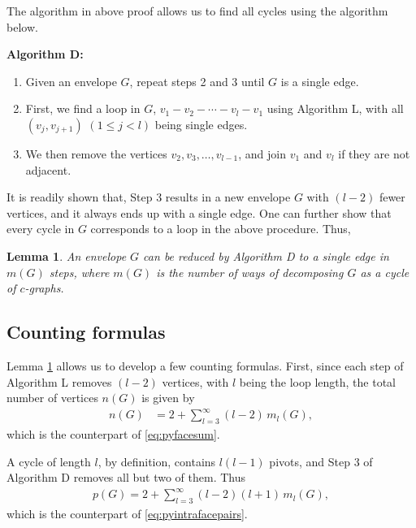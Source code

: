 \documentclass[aip,jcp,reprint,superscriptaddress]{revtex4-1}
\newtheorem{lemm}[thrm]{Lemma}
\begin{document}
The algorithm in above proof allows us to
  find all cycles using the algorithm below.

\textbf{Algorithm D:}
\begin{enumerate}
  \item
    Given an envelope $G$,
      repeat steps 2 and 3 until $G$ is a single edge.
  \item
    First, we find a loop in $G$,
      $v_1 - v_2 - \cdots - v_l - v_1$
      using Algorithm L,
      with all $(v_j, v_{j+1})$ $(1 \le j < l)$
      being single edges.
  \item
    We then remove the vertices $v_2, v_3, \dots, v_{l-1}$,
      and join $v_1$ and $v_l$ if they are not adjacent.
\end{enumerate}
%
It is readily shown that,
  Step 3 results in a new envelope $G$
  with $(l - 2)$ fewer vertices,
  and it always ends up with a single edge.
%
One can further show that every cycle in $G$
  corresponds to a loop in the above procedure.
%
Thus,

\begin{lemm}
  An envelope $G$ can be reduced
    by Algorithm D to a single edge in $m(G)$ steps,
    where $m(G)$ is the number of ways of decomposing
    $G$ as a cycle of $c$-graphs.
\label{thm:hncdecomp}
\end{lemm}



\subsection*{Counting formulas}


Lemma \ref{thm:hncdecomp} allows us to develop a few counting formulas.
%
First, since each step of Algorithm L removes $(l - 2)$ vertices,
  with $l$ being the loop length,
  the total number of vertices $n(G)$ is given by
%
\begin{align}
  n(G) &= 2 + \sum_{l = 3}^\infty (l - 2) \, m_l(G),
\label{eq:hnccountn}
\end{align}
%
which is the counterpart of \eqref{eq:pyfacesum}.

A cycle of length $l$, by definition,
  contains $l (l - 1)$ pivots,
  and Step 3 of Algorithm D
  removes all but two of them.
%
Thus
%
\begin{align}
  p(G) = 2 + \sum_{l = 3}^\infty (l-2)(l+1) \, m_l(G),
\label{eq:hnccountp}
\end{align}
%
which is the counterpart of \eqref{eq:pyintrafacepairs}.
\end{document}
